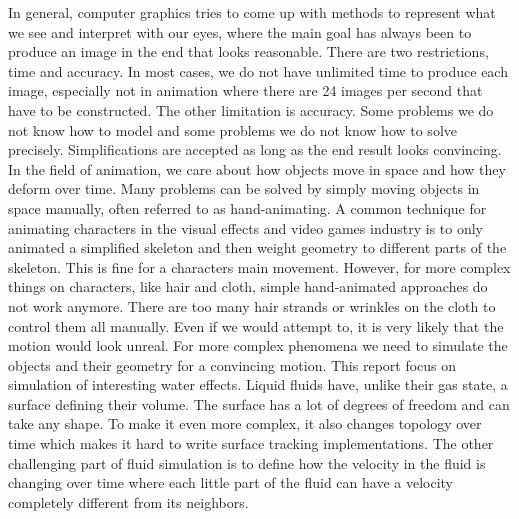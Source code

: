 In general, computer graphics tries to come up with methods to represent what we see and interpret with our eyes, where the main goal has always been to produce an image in the end that looks reasonable. There are two restrictions, time and accuracy. In most cases, we do not have unlimited time to produce each image, especially not in animation where there are 24 images per second that have to be constructed. The other limitation is accuracy. Some problems we do not know how to model and some problems we do not know how to solve precisely. Simplifications are accepted as long as the end result looks convincing. 
\newline
\newline
In the field of animation, we care about how objects move in space and how they deform over time. Many problems can be solved by simply moving objects in space manually, often referred to as hand-animating. A common technique for animating characters in the visual effects and video games industry is to only animated a simplified skeleton and then weight geometry to different parts of the skeleton. This is fine for a characters main movement. However, for more complex things on characters, like hair and cloth, simple hand-animated approaches do not work anymore. There are too many hair strands or wrinkles on the cloth to control them all manually. Even if we would attempt to, it is very likely that the motion would look unreal. For more complex phenomena we need to simulate the objects and their geometry for a convincing motion.
\newline
\newline
This report focus on simulation of interesting water effects. Liquid fluids have, unlike their gas state, a surface defining their volume. The surface has a lot of degrees of freedom and can take any shape. To make it even more complex, it also changes topology over time which makes it hard to write surface tracking implementations. The other challenging part of fluid simulation is to define how the velocity in the fluid is changing over time where each little part of the fluid can have a velocity completely different from its neighbors. 
